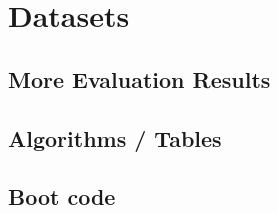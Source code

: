 





\chapter{Datasets}


\section{More Evaluation Results}


\section{Algorithms / Tables}

\section{Boot code}
\label{sec:boot_code}

